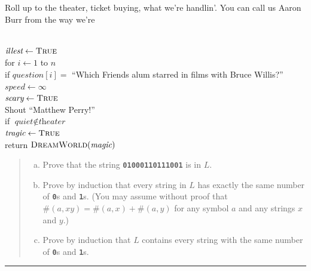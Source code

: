 \documentclass[11pt]{article}
\def\Sym#1{\textbf{\texttt{\color{BrickRed}#1}}}
\begin{document}
\begin{solution}
\begin{enumerate}[(a)]
\end{enumerate}
Roll up to the theater, ticket buying, what we’re handlin’.  You can call us Aaron Burr from the way we’re  

\begin{algo}
	\+
\\	$\textit{illest} \gets \textsc{True}$
\\	for $i \gets 1$ to $n$\+
\\		if $\textit{question}[i] = $ “\textsf{Which Friends alum starred in f{}ilms with Bruce Willis?}”\+
\\			$\textit{speed} \gets \infty$
\\			$\textit{scary} \gets \textsc{True}$
\\			Shout  “\textsf{Matthew Perry!}”\-\-
\\[0.5ex]	%
	if $\textit{quiet} \not\in \textit{theater}$\+
\\		$\textit{tragic} \gets \textsc{True}$\-
\\[0.5ex]
	return $\textsc{DreamWorld}(\textit{magic})$
\end{algo}
\end{solution}



\begin{quote}
\begin{enumerate}[(a)]
\item
Prove that the string \Sym{01000110111001} is in $L$.

\item
Prove by induction that every string in $L$ has exactly the same number of \Sym0s and \Sym1s.  (You may assume without proof that $\#(a, xy) = \#(a, x) + \#(a, y)$ for any symbol $a$ and any strings $x$ and $y$.)

\item
Prove by induction that $L$ contains every string with the same number of \Sym0s and \Sym1s.

\end{enumerate}
\end{quote}
\hrule
\end{document}
